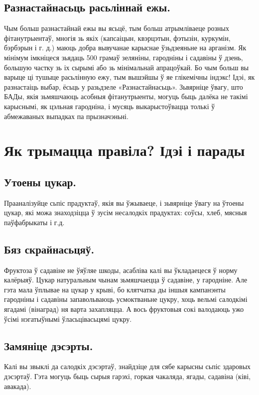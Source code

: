 \subsection{Разнастайнасьць расьліннай ежы.}
Чым больш разнастайнай ежы вы ясьцё, тым больш атрымліваеце розных фітанутрыентаў, многія зь якіх (капсаіцын, квэрцэтын, фэтызін, куркумін, бэрбэрын і г. д.) маюць добра вывучанае карыснае ўзьдзеяньне на арганізм. Як мінімум імкніцеся зьядаць 500 грамаў зеляніны, гародніны і садавіны ў дзень, большую частку зь іх сырымі або зь мінімальнай апрацоўкай. Бо чым больш вы варыце ці тушыце расьлінную ежу, тым вышэйшы ў яе глікемічны індэкс! Ідэі, як разнастаіць выбар, ёсьць у разьдзеле «Разнастайнасьць». Зьвярніце ўвагу, што БАДы, якія зьмяшчаюць асобныя фітанутрыенты, могуць быць далёка не такімі карыснымі, як цэльная гародніна, і мусяць выкарыстоўвацца толькі ў абмежаваных выпадках па прызначэньні.

\section{Як трымацца правіла? Ідэі і парады}

\subsection{Утоены цукар.}
Прааналізуйце сьпіс прадуктаў, якія вы ўжываеце, і зьвярніце ўвагу на ўтоены цукар, які можа знаходзіцца ў зусім несалодкіх прадуктах: соўсы, хлеб, мясныя паўфабрыкаты і г.д.

\subsection{Бяз скрайнасьцяў.}
Фруктоза ў садавіне не ўяўляе шкоды, асабліва калі вы ўкладаецеся ў норму калёрыяў. Цукар натуральным чынам зьмяшчаецца ў садавіне, у гародніне. Але гэта мала ўплывае на цукар у крыві, бо клятчатка ды іншыя кампанэнты гародніны і садавіны запавольваюць усмоктваньне цукру, хоць вельмі салодкімі ягадамі (вінаград) ня варта захапляцца. А вось фруктовыя сокі валодаюць ужо ўсімі нэгатыўнымі ўласьцівасьцямі цукру.

\subsection{Замяніце дэсэрты.}
Калі вы звыклі да салодкіх дэсэртаў, знайдзіце для сябе карысны сьпіс здаровых дэсэртаў. Гэта могуць быць сырыя гарэхі, горкая чакаляда, ягады, садавіна (ківі, авакада).

